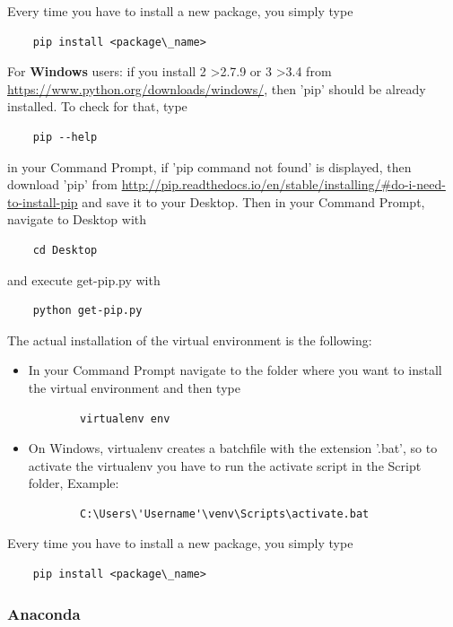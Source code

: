 \documentclass[a4paper, 11pt, fleqn]{memoir}
\begin{document}
Every time you have to install a new  package, you simply type
\begin{verbatim}
    pip install <package\_name>
\end{verbatim}

For \textbf{Windows} users: if you install 2 >2.7.9 or  3 >3.4 from \url{https://www.python.org/downloads/windows/}, then 'pip' should be already installed.
To check for that, type
\begin{verbatim}
    pip --help
\end{verbatim}
in your Command Prompt, if 'pip command not found' is displayed, then download 'pip' from \url{http://pip.readthedocs.io/en/stable/installing/#do-i-need-to-install-pip} and save it to your Desktop.
Then in your Command Prompt, navigate to Desktop with
\begin{verbatim}
    cd Desktop
\end{verbatim}
and execute get-pip.py with
\begin{verbatim}
    python get-pip.py
\end{verbatim}

The actual installation of the virtual environment is the following:
\begin{itemize}
    \item In your Command Prompt navigate to the folder where you want to install the virtual environment and then type
          \begin{verbatim}
        virtualenv env
    \end{verbatim}
    \item On Windows, virtualenv creates a batchfile with the extension '.bat', so to activate the virtualenv you have to run the activate script in the Script folder, Example:
          \begin{verbatim}
        C:\Users\'Username'\venv\Scripts\activate.bat
    \end{verbatim}
\end{itemize}

Every time you have to install a new  package, you simply type
\begin{verbatim}
    pip install <package\_name>
\end{verbatim}

\subsubsection{Anaconda}
\end{document}
